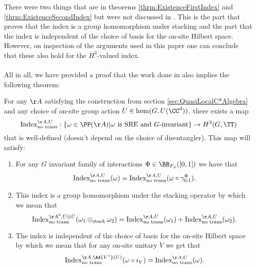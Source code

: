 There were two things that are in theorems \ref{thrm:ExistenceFirstIndex} and \ref{thrm:ExistenceSecondIndex} but were not discussed in \cite{Ogata2d}. This is the part that proves that the index is a group homomorphism under stacking and the part that the index is independent of the choice of basis for the on-site Hilbert space. However, on inspection of the arguments used in this paper one can conclude that these also hold for the $H^3$-valued index.\\\\
All in all, we have provided a proof that the work done in \cite{Ogata2d} also implies the following theorem:
\begin{theorem}\label{thrm:ExistenceOriginalIndex}
	For any $\AA$ satisfying the construction from section \ref{sec:QuasiLocalC*Algebra} and any choice of on-site group action $U\in\hom(G,U(\CC^d))$, there exists a map
	\begin{equation}
		\textrm{Index}^{\AA,U}_{\text{no trans}}:\{\omega\in\PP(\AA)| \omega\text{ is SRE and }G\text{-invariant}\}\rightarrow H^3(G,\TT)
	\end{equation}
	that is well-defined (doesn't depend on the choice of disentangler). This map will satisfy:
	\begin{enumerate}
		\item For any $G$ invariant family of interactions $\Phi\in\BB_{F_\phi}([0,1])$ we have that
		\begin{equation}
			\textrm{Index}^{\AA,U}_{\text{no trans}}(\omega)=\textrm{Index}^{\AA,U}_{\text{no trans}}(\omega\circ\gamma^\Phi_{0;1}).
		\end{equation}
		\item This index is a group homomorphism under the stacking operator by which we mean that
		\begin{equation}
			\textrm{Index}_{\text{no trans}}^{\AA^2,U\otimes U}(\omega_1\otimes_{\text{stack}}\omega_2)=\textrm{Index}_{\text{no trans}}^{\AA,U}(\omega_1)+\textrm{Index}_{\text{no trans}}^{\AA,U}(\omega_2).
		\end{equation}
		\item The index is independent of the choice of basis for the on-site Hilbert space by which we mean that for any on-site unitary $V$ we get that
		\begin{equation}
			\textrm{Index}^{\AA,\Ad{V^\dagger}(U)}_{\text{no trans}}(\omega\circ i_V) =\textrm{Index}^{\AA,U}_{\text{no trans}}(\omega).
		\end{equation}
	\end{enumerate}
\end{theorem}

